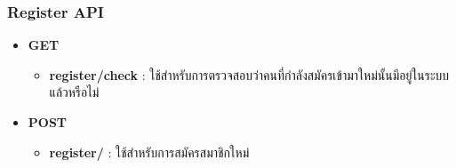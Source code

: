 \subsubsection{Register API}

\ifenglish
\else
\begin{itemize}
    \item \textbf{GET}
    \begin{itemize}
        \item \textbf{register/check} : ใช้สำหรับการตรวจสอบว่าคนที่กำลังสมัครเข้ามาใหม่นั้นมีอยู่ในระบบแล้วหรือไม่
    \end{itemize}
    \item \textbf{POST}
    \begin{itemize}
        \item \textbf{register/} : ใช้สำหรับการสมัครสมาชิกใหม่
    \end{itemize}
\end{itemize}
\fi